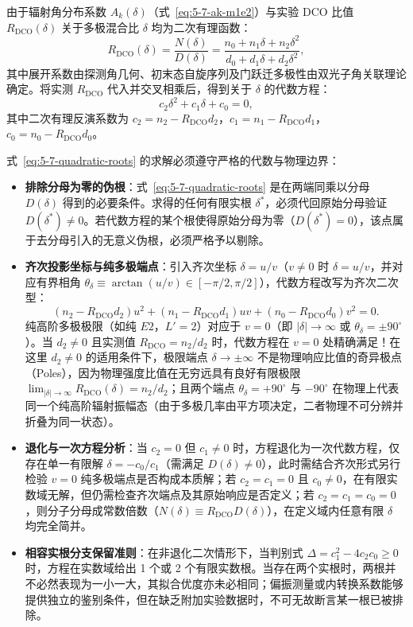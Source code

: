 由于辐射角分布系数 $A_k(\delta)$（式~\eqref{eq:5-7-ak-m1e2}）与实验 DCO 比值 $R_{\mathrm{DCO}}(\delta)$ 关于多极混合比 $\delta$ 均为二次有理函数：
\begin{equation}\label{eq:5-7-dco-rational}
R_{\mathrm{DCO}}(\delta) = \frac{N(\delta)}{D(\delta)} = \frac{n_0 + n_1 \delta + n_2 \delta^2}{d_0 + d_1 \delta + d_2 \delta^2},
\end{equation}
其中展开系数由探测角几何、初末态自旋序列及门跃迁多极性由双光子角关联理论确定。将实测 $R_{\mathrm{DCO}}$ 代入并交叉相乘后，得到关于 $\delta$ 的代数方程：
\begin{equation}\label{eq:5-7-quadratic-roots}
c_2 \delta^2 + c_1 \delta + c_0 = 0,
\end{equation}
其中二次有理反演系数为 $c_2 = n_2 - R_{\mathrm{DCO}} d_2$，$c_1 = n_1 - R_{\mathrm{DCO}} d_1$，$c_0 = n_0 - R_{\mathrm{DCO}} d_0$。

式~\eqref{eq:5-7-quadratic-roots} 的求解必须遵守严格的代数与物理边界：
\begin{itemize}
\item \textbf{排除分母为零的伪根}：式~\eqref{eq:5-7-quadratic-roots} 是在两端同乘以分母 $D(\delta)$ 得到的必要条件。求得的任何有限实根 $\delta^*$，必须代回原始分母验证 $D(\delta^*) \ne 0$。若代数方程的某个根使得原始分母为零（$D(\delta^*) = 0$），该点属于去分母引入的无意义伪根，必须严格予以剔除。
\item \textbf{齐次投影坐标与纯多极端点}：引入齐次坐标 $\delta = u/v$（$v \ne 0$ 时 $\delta = u/v$，并对应有界相角 $\theta_\delta \equiv \arctan(u/v) \in [-\pi/2, \pi/2]$），代数方程改写为齐次二次型：
\begin{equation}\label{eq:5-7-projective-form}
(n_2 - R_{\mathrm{DCO}} d_2) u^2 + (n_1 - R_{\mathrm{DCO}} d_1) uv + (n_0 - R_{\mathrm{DCO}} d_0) v^2 = 0.
\end{equation}
纯高阶多极极限（如纯 $E2$，$L'=2$）对应于 $v=0$（即 $|\delta| \to \infty$ 或 $\theta_\delta = \pm 90^\circ$）。当 $d_2 \ne 0$ 且实测值 $R_{\mathrm{DCO}} = n_2 / d_2$ 时，代数方程在 $v=0$ 处精确满足！在这里 $d_2\ne0$ 的适用条件下，极限端点 $\delta \to \pm\infty$ 不是物理响应比值的奇异极点（Poles），因为物理强度比值在无穷远具有良好有限极限 $\lim_{|\delta| \to \infty} R_{\mathrm{DCO}}(\delta) = n_2 / d_2$；且两个端点 $\theta_\delta = +90^\circ$ 与 $-90^\circ$ 在物理上代表同一个纯高阶辐射振幅态（由于多极几率由平方项决定，二者物理不可分辨并折叠为同一状态）。
\item \textbf{退化与一次方程分析}：当 $c_2 = 0$ 但 $c_1 \ne 0$ 时，方程退化为一次代数方程，仅存在单一有限解 $\delta = -c_0/c_1$（需满足 $D(\delta) \ne 0$），此时需结合齐次形式另行检验 $v=0$ 纯多极端点是否构成本质解；若 $c_2 = c_1 = 0$ 且 $c_0 \ne 0$，在有限实数域无解，但仍需检查齐次端点及其原始响应是否定义；若 $c_2 = c_1 = c_0 = 0$，则分子分母成常数倍数（$N(\delta) \equiv R_{\mathrm{DCO}} D(\delta)$），在定义域内任意有限 $\delta$ 均完全简并。
\item \textbf{相容实根分支保留准则}：在非退化二次情形下，当判别式 $\Delta = c_1^2 - 4 c_2 c_0 \ge 0$ 时，方程在实数域给出 1 个或 2 个有限实数根。当存在两个实根时，两根并不必然表现为一小一大，其拟合优度亦未必相同；偏振测量或内转换系数能够提供独立的鉴别条件，但在缺乏附加实验数据时，不可无故断言某一根已被排除。
\end{itemize}

